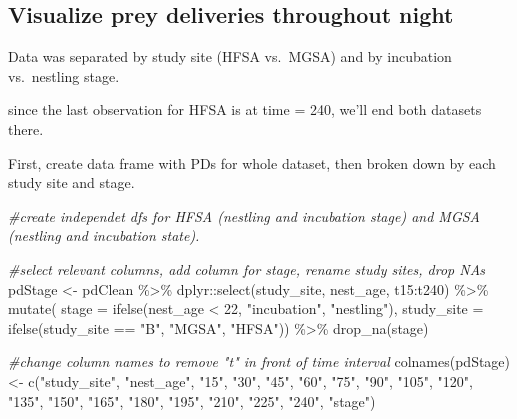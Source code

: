 \documentclass[
]{article}
\newenvironment{Shaded}{\begin{snugshade}}{\end{snugshade}}
\newcommand{\AttributeTok}[1]{\textcolor[rgb]{0.77,0.63,0.00}{#1}}
\newcommand{\CommentTok}[1]{\textcolor[rgb]{0.56,0.35,0.01}{\textit{#1}}}
\newcommand{\DecValTok}[1]{\textcolor[rgb]{0.00,0.00,0.81}{#1}}
\newcommand{\FunctionTok}[1]{\textcolor[rgb]{0.00,0.00,0.00}{#1}}
\newcommand{\NormalTok}[1]{#1}
\newcommand{\OtherTok}[1]{\textcolor[rgb]{0.56,0.35,0.01}{#1}}
\newcommand{\SpecialCharTok}[1]{\textcolor[rgb]{0.00,0.00,0.00}{#1}}
\newcommand{\StringTok}[1]{\textcolor[rgb]{0.31,0.60,0.02}{#1}}
\begin{document}
\hypertarget{visualize-prey-deliveries-throughout-night}{%
\subsection{Visualize prey deliveries throughout
night}\label{visualize-prey-deliveries-throughout-night}}

Data was separated by study site (HFSA vs.~MGSA) and by incubation
vs.~nestling stage.

since the last observation for HFSA is at time = 240, we'll end both
datasets there.

First, create data frame with PDs for whole dataset, then broken down by
each study site and stage.

\begin{Shaded}
\begin{Highlighting}[]
\CommentTok{\#create independet dfs for HFSA (nestling and incubation stage) and MGSA (nestling and incubation state). }

\CommentTok{\#select relevant columns, add column for stage, rename study sites, drop NAs}
\NormalTok{pdStage }\OtherTok{\textless{}{-}}\NormalTok{ pdClean }\SpecialCharTok{\%\textgreater{}\%}
\NormalTok{  dplyr}\SpecialCharTok{::}\FunctionTok{select}\NormalTok{(study\_site, nest\_age, t15}\SpecialCharTok{:}\NormalTok{t240) }\SpecialCharTok{\%\textgreater{}\%}
  \FunctionTok{mutate}\NormalTok{(}
    \AttributeTok{stage =}
      \FunctionTok{ifelse}\NormalTok{(nest\_age }\SpecialCharTok{\textless{}} \DecValTok{22}\NormalTok{, }\StringTok{"incubation"}\NormalTok{, }\StringTok{"nestling"}\NormalTok{),}
    \AttributeTok{study\_site =}
      \FunctionTok{ifelse}\NormalTok{(study\_site }\SpecialCharTok{==} \StringTok{"B"}\NormalTok{, }\StringTok{"MGSA"}\NormalTok{, }\StringTok{"HFSA"}\NormalTok{)) }\SpecialCharTok{\%\textgreater{}\%}
  \FunctionTok{drop\_na}\NormalTok{(stage)}

\CommentTok{\#change column names to remove "t" in front of time interval}
\FunctionTok{colnames}\NormalTok{(pdStage) }\OtherTok{\textless{}{-}} \FunctionTok{c}\NormalTok{(}\StringTok{"study\_site"}\NormalTok{, }\StringTok{"nest\_age"}\NormalTok{, }\StringTok{"15"}\NormalTok{, }\StringTok{"30"}\NormalTok{, }\StringTok{"45"}\NormalTok{, }\StringTok{"60"}\NormalTok{, }\StringTok{"75"}\NormalTok{, }\StringTok{"90"}\NormalTok{, }\StringTok{"105"}\NormalTok{, }\StringTok{"120"}\NormalTok{, }\StringTok{"135"}\NormalTok{, }\StringTok{"150"}\NormalTok{, }\StringTok{"165"}\NormalTok{, }\StringTok{"180"}\NormalTok{, }\StringTok{"195"}\NormalTok{, }\StringTok{"210"}\NormalTok{, }\StringTok{"225"}\NormalTok{, }\StringTok{"240"}\NormalTok{, }\StringTok{"stage"}\NormalTok{)}


\end{Highlighting}
\end{Shaded}
\end{document}
